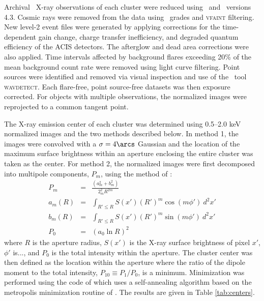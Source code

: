 \documentclass{aastex}
\begin{document}
Archival \chandra\ X-ray observations of each cluster were reduced
using \ciao\ and \caldb\ versions 4.3. Cosmic rays were removed from
the data using \asca\ grades and {\textsc{vfaint}} filtering. New
level-2 event files were generated by applying corrections for the
time-dependent gain change, charge transfer inefficiency, and degraded
quantum efficiency of the ACIS detectors. The afterglow and dead area
corrections were also applied. Time intervals affected by background
flares exceeding 20\% of the mean background count rate were removed
using light curve filtering. Point sources were identified and removed
via visual inspection and use of the \ciao\ tool
{\textsc{wavdetect}}. Each flare-free, point source-free datasets was
then exposure corrected. For objects with multiple observations, the
normalized images were reprojected to a common tangent point.

The X-ray emission center of each cluster was determined using
0.5--2.0 keV normalized images and the two methods described below. In
method 1, the images were convolved with a $\sigma = 4\arcs$ Gaussian
and the location of the maximum surface brightness within an aperture
enclosing the entire cluster was taken as the center. For method 2,
the normalized images were first decomposed into multipole components,
$P_m$, using the method of \citet{1995ApJ...452..522B}:
\begin{eqnarray}
  P_m &=& \frac{(a_m^2+b_m^2)}{2_m^2 R^{2m}}\\
  a_m(R) &=& \int_{R' \le R} S(x')(R')^m \cos(m\phi') ~d^2x'\\
  b_m(R) &=& \int_{R' \le R} S(x')(R')^m \sin(m\phi') ~d^2x'\\
  P_0 &=& (a_0 \ln R)^2
\end{eqnarray}
where $R$ is the aperture radius, $S(x')$ is the X-ray surface
brightness of pixel $x'$, $\phi'$ is..., and $P_0$ is the total
intensity within the aperture. The cluster center was then defined as
the location within the aperture where the ratio of the dipole moment
to the total intensity, $P_{10} \equiv P_1/P_0$, is a
minimum. Minimization was performed using the code of \citet{vv08}
which uses a self-annealing algorithm based on the metropolis
minimization routine of \citet{1992nrfa.book.....P}. The results are
given in Table \ref{tab:centers}.




\end{document}
